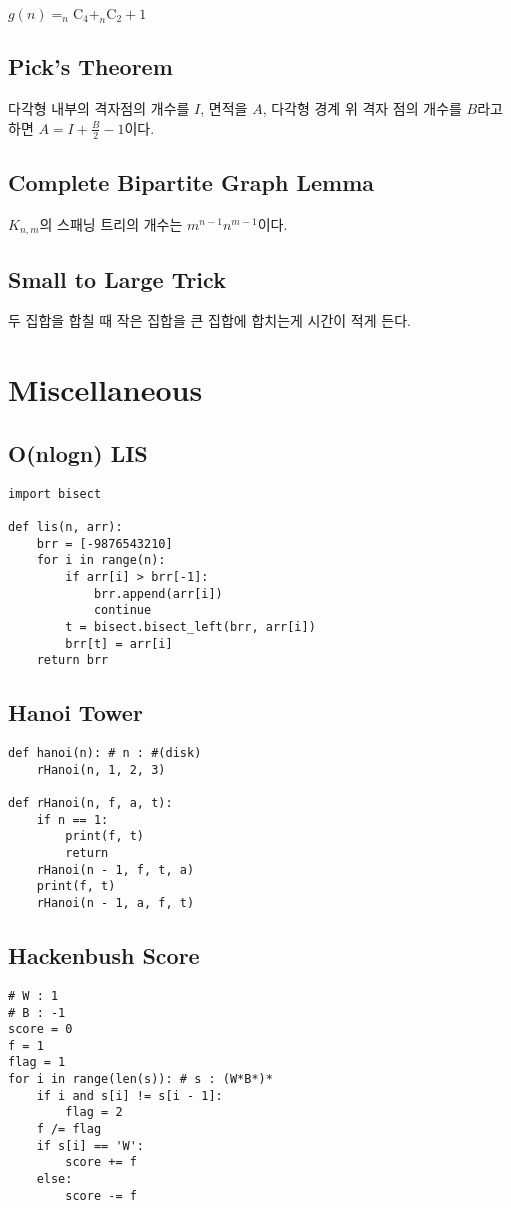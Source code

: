 \documentclass[landscape, 8pt, a4paper, oneside, twocolumn]{extarticle}
\begin{document}
$g(n) = _{n}\mathrm{C}_{4} + _{n}\mathrm{C}_{2} + 1$
\subsection{Pick's Theorem}
다각형 내부의 격자점의 개수를 $I$, 면적을 $A$, 다각형 경계 위 격자 점의 개수를 $B$라고 하면 $A = I+\frac{B}{2}-1$이다.

\subsection{Complete Bipartite Graph Lemma}
$K_{n,m}$의 스패닝 트리의 개수는 $m^{n-1}n^{m-1}$이다.

\subsection{Small to Large Trick}
두 집합을 합칠 때 작은 집합을 큰 집합에 합치는게 시간이 적게 든다.

\section{Miscellaneous}
\subsection{O(nlogn) LIS}
\begin{verbatim}
import bisect

def lis(n, arr):
    brr = [-9876543210]
    for i in range(n):
        if arr[i] > brr[-1]:
            brr.append(arr[i])
            continue
        t = bisect.bisect_left(brr, arr[i])
        brr[t] = arr[i]
    return brr
\end{verbatim}
\subsection{Hanoi Tower}
\begin{verbatim}
def hanoi(n): # n : #(disk)
    rHanoi(n, 1, 2, 3)

def rHanoi(n, f, a, t):
    if n == 1:
        print(f, t)
        return
    rHanoi(n - 1, f, t, a)
    print(f, t)
    rHanoi(n - 1, a, f, t)
\end{verbatim}
\subsection{Hackenbush Score}
\begin{verbatim}
# W : 1
# B : -1
score = 0
f = 1
flag = 1
for i in range(len(s)): # s : (W*B*)*
    if i and s[i] != s[i - 1]:
        flag = 2
    f /= flag
    if s[i] == 'W':
        score += f
    else:
        score -= f
\end{verbatim}
\end{document}
